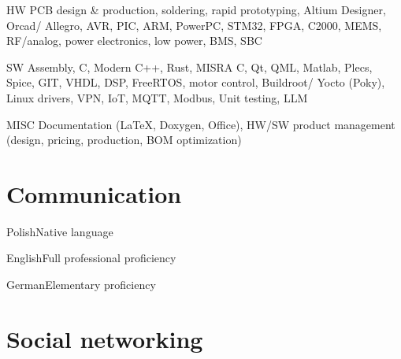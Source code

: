 \documentclass{tccv}
\begin{document}
\newlength{\factlistspacing}
\setlength{\factlistspacing}{0.3cm}

\begin{factlist}

\vspace{\factlistspacing}
\item{HW}
     {PCB design \& production, soldering, rapid prototyping, Altium Designer, Orcad/ Allegro, AVR, PIC, ARM, PowerPC, STM32, FPGA, C2000, MEMS, RF/analog, power electronics, low power, BMS, SBC}

\vspace{\factlistspacing}
\item{SW}
     {Assembly, C, Modern C++, Rust, MISRA C, Qt, QML, Matlab, Plecs, Spice, GIT, VHDL, DSP, FreeRTOS, motor control, Buildroot/ Yocto (Poky), Linux drivers, VPN, IoT, MQTT, Modbus, Unit testing, LLM}

\vspace{\factlistspacing}
\item{MISC}
     {Documentation (\LaTeX, Doxygen, Office), HW/SW product management (design, pricing, production, BOM optimization)}

\end{factlist}

\section{Communication}

\begin{factlist}

\vspace{\factlistspacing}
\item{Polish}{Native language}

\vspace{\factlistspacing}
\item{English}{Full professional proficiency}

\vspace{\factlistspacing}
\item{German}{Elementary proficiency}

\end{factlist}

\section{Social networking}
\end{document}
